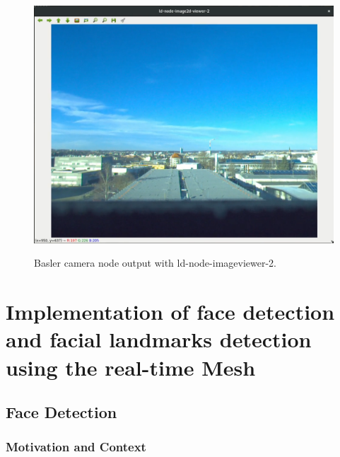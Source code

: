 \documentclass[a4paper, 12pt, oneside]{report}
\begin{document}
  \begin{figure}[h]
      \caption{Basler camera node output with ld-node-imageviewer-2.}
      \centering
      \includegraphics[width=1\textwidth]{basleroutput}
      \label{fig:baslerout}
  \end{figure}
  
  
  \newpage
  \chapter{Implementation of face detection and facial landmarks detection using the real-time Mesh}
  
  \section{Face Detection}
  \subsection{Motivation and Context}
  
\end{document}
